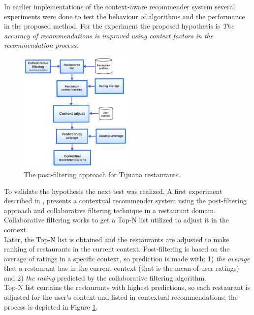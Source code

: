 In earlier implementations of the context-aware recommender system  
several experiments were done to test the behaviour of algorithms 
and the performance in the proposed method. 
For the experiment the proposed hypothesis is \textit{The accuracy of 
recommendations is improved using context factors in the 
recommendation process}. 
\begin{figure}
\centering
\captionsetup{font=footnotesize}
\setlength\fboxsep{0pt}
\includegraphics[width=0.50\textwidth]{img/posfil.png}
\caption{The post-filtering approach for Tijuana restaurants.}
\label{fig:postfiltering}     
\end{figure}
To validate the hypothesis the next test was realized.
A first experiment described in  \cite{ramirez2013restaurant}, presents a  
contextual recommender system using the post-filtering approach and 
collaborative filtering technique in a restaurant domain. 
Collaborative filtering works to get a Top-N list utilized to adjust it in 
the context. \\
Later, the Top-N list is obtained and the restaurants are adjusted to 
make ranking of restaurants  in the current context. Post-filtering is
based on the average  of ratings in a specific context, so prediction
is made with: 1) \textit{the average} that a restaurant has in the
current context (that is the  mean of user ratings) and 2)  
 \textit{the rating} predicted by the collaborative filtering algorithm.\\ 
Top-N list contains the restaurants with highest predictions, 
so each restaurant is adjusted for the user's context and listed in 
contextual recommendations; the process is depicted in 
Figure  \ref{fig:postfiltering}.

